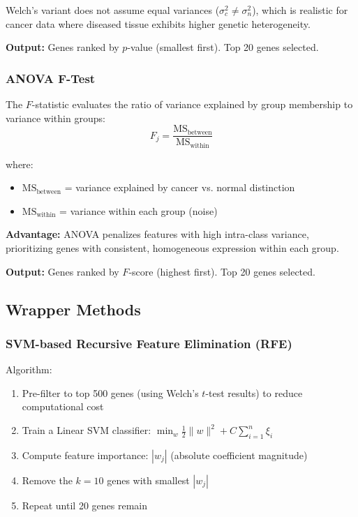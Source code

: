 Welch's variant does not assume equal variances ($\sigma_c^2 \neq \sigma_n^2$), which is realistic for cancer data where diseased tissue exhibits higher genetic heterogeneity.

\textbf{Output:} Genes ranked by $p$-value (smallest first). Top 20 genes selected.

\subsubsection{ANOVA F-Test}

The $F$-statistic evaluates the ratio of variance explained by group membership to variance within groups:
\begin{equation}
    F_j = \frac{\text{MS}_{\text{between}}}{\text{MS}_{\text{within}}}
\end{equation}

where:
\begin{itemize}
    \item $\text{MS}_{\text{between}}$ = variance explained by cancer vs. normal distinction
    \item $\text{MS}_{\text{within}}$ = variance within each group (noise)
\end{itemize}

\textbf{Advantage:} ANOVA penalizes features with high intra-class variance, prioritizing genes with consistent, homogeneous expression within each group.

\textbf{Output:} Genes ranked by $F$-score (highest first). Top 20 genes selected.

\subsection{Wrapper Methods}

\subsubsection{SVM-based Recursive Feature Elimination (RFE)}

Algorithm:
\begin{enumerate}
    \item Pre-filter to top 500 genes (using Welch's $t$-test results) to reduce computational cost
    \item Train a Linear SVM classifier: $\min_w \frac{1}{2}\|w\|^2 + C \sum_{i=1}^{n} \xi_i$
    \item Compute feature importance: $|w_j|$ (absolute coefficient magnitude)
    \item Remove the $k=10$ genes with smallest $|w_j|$
    \item Repeat until 20 genes remain
\end{enumerate}

